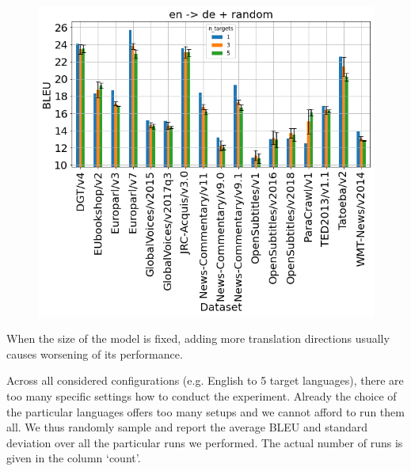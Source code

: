 \begin{figure}[h]
	\centering
	\includegraphics[width=1.0\columnwidth]{img/random_en_de.png}
	\label{fig:random_en_de}
\end{figure}

When the size of the model is fixed, adding more translation directions usually causes
worsening of its performance.

Across all considered configurations (e.g. English to 5 target languages),
there are too many specific settings how to conduct the experiment.
Already the choice of the particular languages offers too many setups
and we cannot afford to run them all.
We thus randomly sample and report the average BLEU and standard deviation
over all the particular runs we performed.
The actual number of runs is given in the column `count'.



